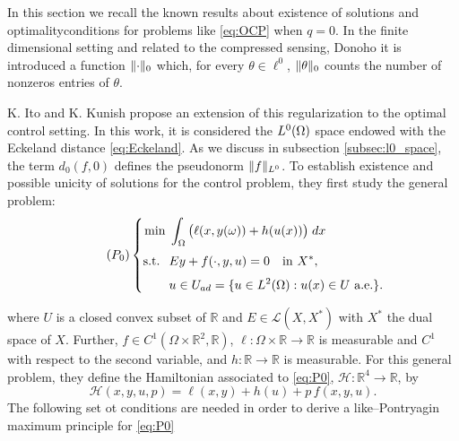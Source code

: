 In this section we recall the known results about existence of solutions
and optimalityconditions for problems like \eqref{eq:OCP} when $q=0$. In the 
finite dimensional setting and related to the compressed sensing, Donoho \cite{donoho} it is introduced
a function $\lVert \cdot \rVert_0$ which, for every $\theta\in\ell^0$, $\lVert \theta \rVert_0$ counts the number 
of nonzeros entries of $\theta$. 

K. Ito and K. Kunish \cite{ito-kunisch2014} propose an extension of this regularization to the optimal control
setting. In this work, it is considered the $L^0(\Omega)$ space endowed with the Eckeland distance \eqref{eq:Eckeland}.
As we discuss in subsection \ref{subsec:l0_space}, the term $d_0(f,0)$ defines the 
pseudonorm $\lVert f \rVert_{L^0}$. To establish existence and possible unicity of solutions for
the control problem, they first study the general problem:
\begin{equation}\label{eq:P0}
\tag{$P_{0}$}
\left\{
\begin{aligned}
\min \;& \int_{\Omega} \big( \ell(x, y(\omega)) + h(u(x)) \big)\; dx \\[0.3em]
\text{s.t. }\;& E y + f(\cdot, y, u) = 0 \quad \text{in } X^*, \\[0.3em]
& u \in U_{ad} = \{ u \in L^2(\Omega) : u(x) \in U \ \text{a.e.} \}.
\end{aligned}
\right.
\end{equation}

where $U$ is a closed convex subset of $\mathbb{R}$ and 
$E \in \mathcal{L}(X, X^*)$ with $X^*$ the dual space of $X$. 
Further, $f \in C^1(\Omega \times \mathbb{R}^2, \mathbb{R})$, 
$\ell : \Omega \times \mathbb{R} \to \mathbb{R}$ is measurable and $C^1$ with respect to the second variable, and 
$h : \mathbb{R} \to \mathbb{R}$ is measurable. For this general problem, they define the Hamiltonian
associated to \eqref{eq:P0}, $\mathcal{H} : \mathbb{R}^4 \to \mathbb{R}$,
 by
\[
\mathcal{H}(x,y,u,p)
= \ell(x,y) + h(u) + p\, f(x,y,u).
\]
The following set ot conditions are needed in order to derive a like--Pontryagin maximum
principle for \eqref{eq:P0}

